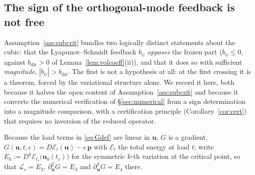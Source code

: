 \subsection{The sign of the orthogonal-mode feedback is not free}
\label{sub:fbsign}

Assumption~\ref{ass:subcrit} bundles two logically distinct statements about the cubic: that the Lyapunov--Schmidt
feedback $b_\psi$ \emph{opposes} the frozen part ($b_\psi\le0$, against $b_{\mathrm{dir}}>0$ of
Lemma~\ref{lem:volcoeff}(ii)), and that it does so with sufficient \emph{magnitude}, $|b_\psi|>b_{\mathrm{dir}}$. The
first is not a hypothesis at all: at the first crossing it is a theorem, forced by the variational structure alone. We
record it here, both because it halves the open content of Assumption~\ref{ass:subcrit} and because it converts the
numerical verification of \S\ref{sec:numerical} from a sign determination into a magnitude comparison, with a
certification principle (Corollary~\ref{cor:cert}) that requires no inversion of the reduced operator.

Because the load terms in \eqref{eq:Gdef} are linear in $\bm{u}$, $G$ is a gradient,
$G(\bm{u},t,\epsilon)=D\mathcal{E}_t(\bm{u})-\epsilon\,\bm{p}$ with $\mathcal{E}_t$ the total energy at load $t$; write
$E_k:=D^k\mathcal{E}_{t_c}\big(\bm{u}_0(t_c)\big)$ for the symmetric $k$-th variation at the critical point, so that
$\mathcal{L}_c=E_2$, $\partial^2_{\bm{u}}G=E_3$ and $\partial^3_{\bm{u}}G=E_4$ there.

